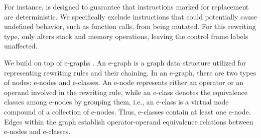 For instance, \tool is designed to guarantee that instructions marked for replacement are deterministic. 
We specifically exclude instructions that could potentially cause undefined behavior, such as function calls, from being mutated. 
For this rewriting type, \tool only alters stack and memory operations, leaving the control frame labels unaffected.




\label{alg}

We build \tool on top of e-graphs \cite{10.1145/3571207}.
An e-graph is a graph data structure utilized for representing rewriting rules and their chaining. 
In an e-graph, there are two types of nodes: e-nodes and e-classes. 
An e-node represents either an operator or an operand involved in the rewriting rule, while an e-class denotes the equivalence classes among e-nodes by grouping them, i.e., an e-class is a virtual node compound of a collection of e-nodes. 
Thus, e-classes contain at least one e-node.
Edges within the graph establish operator-operand equivalence relations between e-nodes and e-classes.

